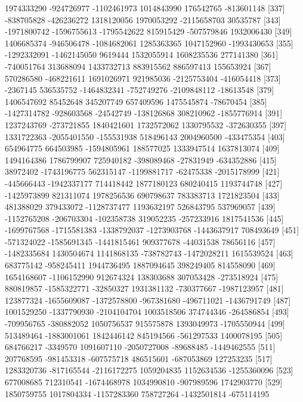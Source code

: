 \documentclass[11pt]{article}
\begin{document}
{\begin{Schunk}
\begin{Soutput}
[331]  1974333290  -924726977 -1102461973  1014843990   176542765  -813601148
[337]  -838705828  -426236272  1318120056  1970053292 -2115658703    30535787
[343] -1971800742 -1596755613 -1795542622   815915429  -507579846  1932006430
[349]  1406685374  -946506478 -1084682061  1285363365  1047152960 -1993430653
[355] -1292332091 -1462145050     9619444  1532055914  1608235536   277141380
[361]  -740051764   313688094  1433732713   883915562   886597413   155653924
[367]   570286580  -468221611  1691026971   921985036 -2125753404  -416054418
[373]    -2367145   536535752 -1464832341  -752749276 -2109848112   -18613548
[379]  1406547692    85452648   345207749   657409596  1475545874   -78670454
[385] -1427314782  -928603568   -24542749  -138126868   308210962 -1855776914
[391]  1237243769  -273721855  1840421601  1732572062  1330795532  -372630355
[397]  1331722363 -2055401550  -155531938   518496143  2004960500  -433475354
[403]   654964775   664503985 -1594805961   188577025  1333947514  1637813074
[409]  1494164386  1786799907   725940182  -398089468   -27831949  -634352886
[415]    38972402 -1743196775   562315147 -1199881717   -62475338 -2015178999
[421]  -445666443 -1942337177   714418442  1877180123   680240415  1193744748
[427] -1425973899   821311074  1978256536   690798637   783383713  1721823504
[433]   481388029   379433072 -1128737477  1193632197   526843795   537969057
[439] -1152765208  -206703304  -102358738   319052235  -257233916  1817541536
[445] -1699767568 -1715581383 -1338792037 -1273903768 -1443637917   708493649
[451]  -571324022 -1585691345 -1441815461   909377678   -44031538    78656116
[457] -1482335684  1430504674  1141868135  -738782743 -1472028211  1615539524
[463]   683775142  -958245411  1944736495  1887094645   398249405   814558090
[469]  1654168607 -1106152990   912674324   138303688   307053428  -273518924
[475]   880819857 -1585322771   -32850327  1931381132  -730377667 -1987123957
[481]   123877324 -1655609087 -1372578800  -967381680  -496711021 -1436791749
[487]  1001529250 -1337790930 -2104104704  1003518506   374744346  -264586854
[493]  -709956765  -380882052  1050756537   915575878  1393049973 -1705550944
[499]   513489464 -1883001061  1842446142   845194566  -561297533  1400078195
[505]   684766217    -3349570  1091607110 -2050727008   -89688485 -1449462555
[511]   207768595  -981453318  -607575718   486515601  -687053869   127253235
[517]  1283320736  -817165544 -2116172275  1059204835  1152634536 -1255360096
[523]   677008685   712310541 -1674468978  1034990810  -907989596  1742903770
[529]  1850759755  1017804334 -1157283360   758727264 -1432501814  -675114195

\end{Soutput}
\end{Schunk}}
\end{document}
